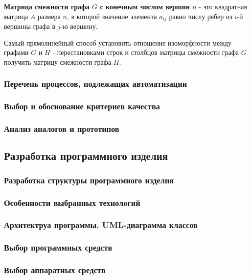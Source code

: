 \documentclass[russian,utf8,emptystyle]{eskdtext}
\begin{document}
\textbf{Матрица смежности графа $G$ с конечным числом вершин $n$} - это квадратная матрица $A$ размера $n$, в которой значение элемента $a_{ij}$ равно числу ребер из $i$-й вершины графа в $j$-ю вершину.

Самый прямолинейный способ установить отношение изоморфности между графами $G$ и $H$ - перестановками строк и столбцов матрицы смежности графа $G$ получить матрицу смежности графа $H$.

\subsubsection{Перечень процессов, подлежащих автоматизации}

\subsubsection{Выбор и обоснование критериев качества}

\subsubsection{Анализ аналогов и прототипов}

\newpage
\subsection{Разработка программного изделия}
\subsubsection{Разработка структуры программного изделия}

\subsubsection{Особенности выбранных технологий}

\subsubsection{Архитектруа программы. UML-диаграмма классов}

\subsubsection{Выбор программных средств}

\subsubsection{Выбор аппаратных средств}
\end{document}
